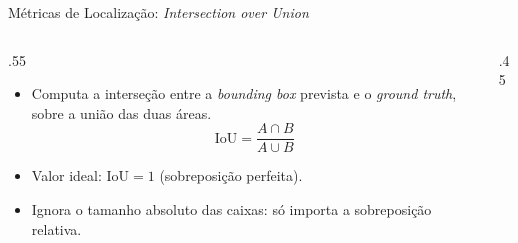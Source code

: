 \documentclass[aspectratio=169,xcolor=dvipsnames]{beamer}
\begin{document}
\begin{frame}{Métricas de Localização: \textit{Intersection over Union}}
\begin{columns}
    \begin{column}{.55\linewidth}
        \begin{itemize}
            \item Computa a interseção entre a \textit{bounding box} prevista e o \textit{ground truth}, sobre a união das duas áreas.
            \begin{equation*}
                \mathrm{IoU} = \frac{A \cap B}{A \cup B}
            \end{equation*}
            \item Valor ideal: $\mathrm{IoU} = 1$ (sobreposição perfeita).
            \item Ignora o tamanho absoluto das caixas: só importa a sobreposição relativa.
        \end{itemize}
    \end{column}
    \begin{column}{.45\linewidth}
        \centering
    \end{column}
\end{columns}
\end{frame}
\end{document}
